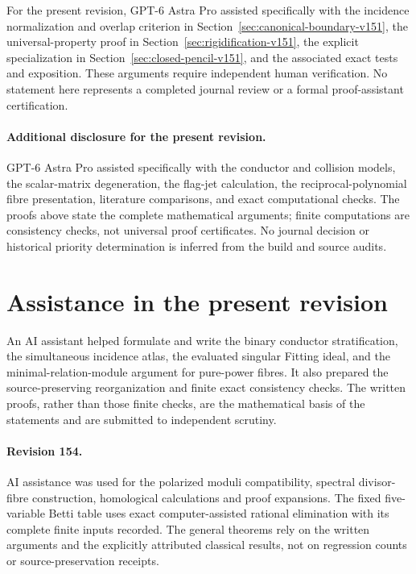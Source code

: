 \documentclass[11pt,reqno]{amsart}
\numberwithin{equation}{section}
\theoremstyle{definition}\newtheorem{definition}[theorem]{Definition}
\theoremstyle{remark}\newtheorem{remark}[theorem]{Remark}
\begin{document}
For the present revision, GPT-6 Astra Pro assisted specifically with the
incidence normalization and overlap criterion in
Section~\ref{sec:canonical-boundary-v151}, the universal-property proof
in Section~\ref{sec:rigidification-v151}, the explicit specialization
in Section~\ref{sec:closed-pencil-v151}, and the associated exact tests
and exposition.  These arguments require independent human verification.
No statement here represents a completed journal review or a formal
proof-assistant certification.

\paragraph{Additional disclosure for the present revision.}
GPT-6 Astra Pro assisted specifically with the conductor and collision
models, the scalar-matrix degeneration, the flag-jet calculation,
the reciprocal-polynomial fibre presentation, literature comparisons,
and exact computational checks.  The proofs above state the complete
mathematical arguments; finite computations are consistency checks,
not universal proof certificates.  No journal decision or historical
priority determination is inferred from the build and source audits.

\section*{Assistance in the present revision}
An AI assistant helped formulate and write the binary conductor stratification,
the simultaneous incidence atlas, the evaluated singular Fitting ideal, and
the minimal-relation-module argument for pure-power fibres. It also prepared
the source-preserving reorganization and finite exact consistency checks.
The written proofs, rather than those finite checks, are the mathematical
basis of the statements and are submitted to independent scrutiny.

\paragraph{Revision 154.}
AI assistance was used for the polarized moduli compatibility,
spectral divisor-fibre construction, homological calculations and
proof expansions. The fixed five-variable Betti table uses exact
computer-assisted rational elimination with its complete finite
inputs recorded. The general theorems rely on the written arguments
and the explicitly attributed classical results, not on regression
counts or source-preservation receipts.
\end{document}
